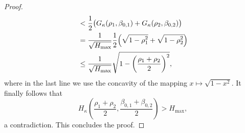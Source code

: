 \begin{proof}
\begin{align*}
        & <  \frac{1}{2} \bigl( G_{\kappa} (\rho_1, \beta_{0, 1}) + G_{\kappa} (\rho_2, \beta_{0, 2}) \bigr) \\
        & =  \frac{1}{\sqrt{H_{\max}}} \frac{1}{2} \Bigl( 
        \sqrt{1 - \smash[b]{\rho_1^2}} + \sqrt{1 - \smash[b]{\rho_2^2}} \Bigr) \\
        & \le \frac{1}{\sqrt{H_{\max}}} \sqrt{1 - \left( \frac{\rho_1 + \rho_2}{2} \right)^2},
    \end{align*}
    where in the last line we use the concavity of the mapping $x \mapsto \sqrt{1 - x^2}$. It finally follows that
    \begin{equation*}
        H_{\kappa} \left( \frac{\rho_1 + \rho_2}{2}, \frac{\beta_{0, 1} + \beta_{0, 2}}{2} \right) > H_{\max},
    \end{equation*}
    a contradiction. This concludes the proof.
\end{proof}

